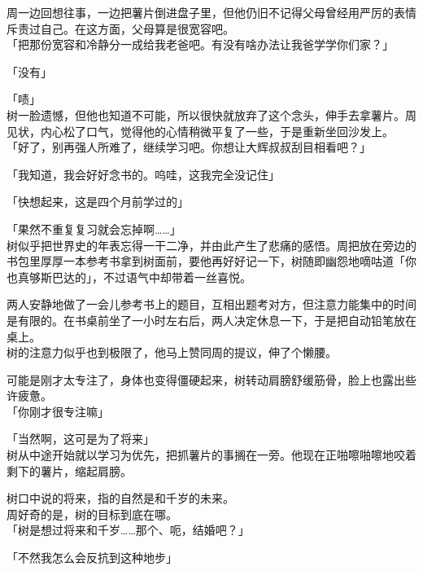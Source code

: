 周一边回想往事，一边把薯片倒进盘子里，但他仍旧不记得父母曾经用严厉的表情斥责过自己。在这方面，父母算是很宽容吧。\\

「把那份宽容和冷静分一成给我老爸吧。有没有啥办法让我爸学学你们家？」

「没有」

「啧」\\

树一脸遗憾，但他也知道不可能，所以很快就放弃了这个念头，伸手去拿薯片。周见状，内心松了口气，觉得他的心情稍微平复了一些，于是重新坐回沙发上。\\

「好了，别再强人所难了，继续学习吧。你想让大辉叔叔刮目相看吧？」

「我知道，我会好好念书的。呜哇，这我完全没记住」

「快想起来，这是四个月前学过的」

「果然不重复复习就会忘掉啊……」\\

树似乎把世界史的年表忘得一干二净，并由此产生了悲痛的感悟。周把放在旁边的书包里厚厚一本参考书拿到树面前，要他再好好记一下，树随即幽怨地嘀咕道「你也真够斯巴达的」，不过语气中却带着一丝喜悦。\\

\vspace{2\baselineskip}

两人安静地做了一会儿参考书上的题目，互相出题考对方，但注意力能集中的时间是有限的。在书桌前坐了一小时左右后，两人决定休息一下，于是把自动铅笔放在桌上。\\

树的注意力似乎也到极限了，他马上赞同周的提议，伸了个懒腰。

可能是刚才太专注了，身体也变得僵硬起来，树转动肩膀舒缓筋骨，脸上也露出些许疲惫。\\

「你刚才很专注嘛」

「当然啊，这可是为了将来」\\

树从中途开始就以学习为优先，把抓薯片的事搁在一旁。他现在正啪嚓啪嚓地咬着剩下的薯片，缩起肩膀。

树口中说的将来，指的自然是和千岁的未来。\\

周好奇的是，树的目标到底在哪。\\

「树是想过将来和千岁……那个、呃，结婚吧？」

「不然我怎么会反抗到这种地步」\\


